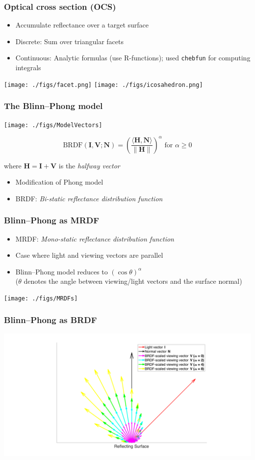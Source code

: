 \documentclass{beamer}
\begin{document}
\begin{frame}[fragile]
\frametitle{Optical cross section (OCS)}
\begin{itemize}
\item Accumulate reflectance over a target surface
\item Discrete: Sum over triangular facets 
\item Continuous: Analytic formulas (use R-functions); 
used \verb+chebfun+ for computing integrals
\end{itemize}
\centerline{\texttt{[image: ./figs/facet.png]} \: \texttt{[image: ./figs/icosahedron.png]}}
\end{frame}

\begin{frame}[t]
\frametitle{The Blinn--Phong model}
\centerline{\texttt{[image: ./figs/ModelVectors]}}
\begin{tcolorbox}
$$\text{BRDF}(\mathbf{I},\mathbf{V};\mathbf{N}) = \left(\frac{\langle\mathbf{H},\mathbf{N}\rangle}{\|\mathbf{H}\|}\right)^\alpha \text{ for } \alpha \geq 0$$
\centerline{where $\mathbf{H} = \mathbf{I} + \mathbf{V}$ is the \textit{halfway vector}}
\end{tcolorbox}
\begin{itemize}
\item Modification of Phong model
\item BRDF: \textit{Bi-static reflectance distribution function}
\end{itemize}
\end{frame}

\begin{frame}[t]
\frametitle{Blinn--Phong as MRDF}
\begin{itemize}
\item MRDF: \textit{Mono-static reflectance distribution function}
\item Case where light and viewing vectors are parallel
\item Blinn--Phong model reduces to $(\cos\theta)^\alpha$ \\
($\theta$ denotes the angle between viewing/light vectors and the surface normal)

\vspace*{0.25 in} 
\end{itemize}
\centerline{\texttt{[image: ./figs/MRDFs]}}
\end{frame}

\begin{frame}
\frametitle{Blinn--Phong as BRDF}
\centerline{\includegraphics[scale=0.4]{./figs/BRDF_Vectors.pdf}}
\end{frame}
\end{document}
